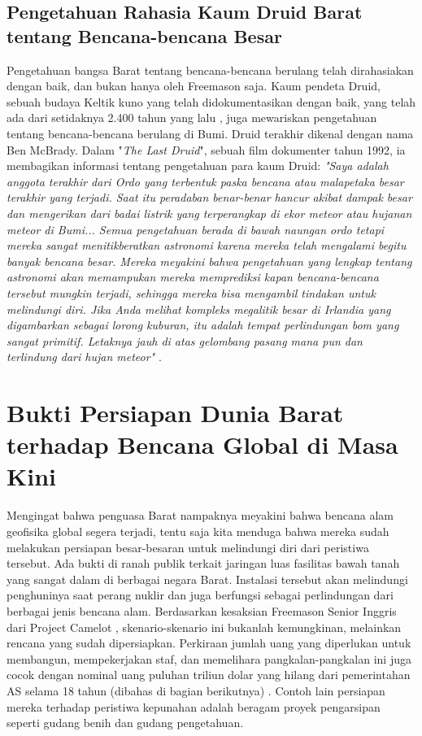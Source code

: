 \documentclass[10pt,twocolumn,letterpaper]{article}
\begin{document}
\subsection{Pengetahuan Rahasia Kaum Druid Barat tentang Bencana-bencana Besar}

Pengetahuan bangsa Barat tentang bencana-bencana berulang telah dirahasiakan dengan baik, dan bukan hanya oleh Freemason saja. Kaum pendeta Druid, sebuah budaya Keltik kuno yang telah didokumentasikan dengan baik, yang telah ada dari setidaknya 2.400 tahun yang lalu \cite{7}, juga mewariskan pengetahuan tentang bencana-bencana berulang di Bumi. Druid terakhir dikenal dengan nama Ben McBrady. Dalam "\textit{The Last Druid}", sebuah film dokumenter tahun 1992, ia membagikan informasi tentang pengetahuan para kaum Druid: \textit{"Saya adalah anggota terakhir dari Ordo yang terbentuk paska bencana atau malapetaka besar terakhir yang terjadi. Saat itu peradaban benar-benar hancur akibat dampak besar dan mengerikan dari badai listrik yang terperangkap di ekor meteor atau hujanan meteor di Bumi... Semua pengetahuan berada di bawah naungan ordo tetapi mereka sangat menitikberatkan astronomi karena mereka telah mengalami begitu banyak bencana besar. Mereka meyakini bahwa pengetahuan yang lengkap tentang astronomi akan memampukan mereka memprediksi kapan bencana-bencana tersebut mungkin terjadi, sehingga mereka bisa mengambil tindakan untuk melindungi diri. Jika Anda melihat kompleks megalitik besar di Irlandia yang digambarkan sebagai lorong kuburan, itu adalah tempat perlindungan bom yang sangat primitif. Letaknya jauh di atas gelombang pasang mana pun dan terlindung dari hujan meteor"} \cite{8,9}.

\section{Bukti Persiapan Dunia Barat terhadap Bencana Global di Masa Kini}

Mengingat bahwa penguasa Barat nampaknya meyakini bahwa bencana alam geofisika global segera terjadi, tentu saja kita menduga bahwa mereka sudah melakukan persiapan besar-besaran untuk melindungi diri dari peristiwa tersebut. Ada bukti di ranah publik terkait jaringan luas fasilitas bawah tanah yang sangat dalam di berbagai negara Barat. Instalasi tersebut akan melindungi penghuninya saat perang nuklir dan juga berfungsi sebagai perlindungan dari berbagai jenis bencana alam. Berdasarkan kesaksian Freemason Senior Inggris dari Project Camelot \cite{4,6}, skenario-skenario ini bukanlah kemungkinan, melainkan rencana yang sudah dipersiapkan. Perkiraan jumlah uang yang diperlukan untuk membangun, mempekerjakan staf, dan memelihara pangkalan-pangkalan ini juga cocok dengan nominal uang puluhan triliun dolar yang hilang dari pemerintahan AS selama 18 tahun (dibahas di bagian berikutnya) \cite{11,12,13}. Contoh lain persiapan mereka terhadap peristiwa kepunahan adalah beragam proyek pengarsipan seperti gudang benih dan gudang pengetahuan.
\end{document}
